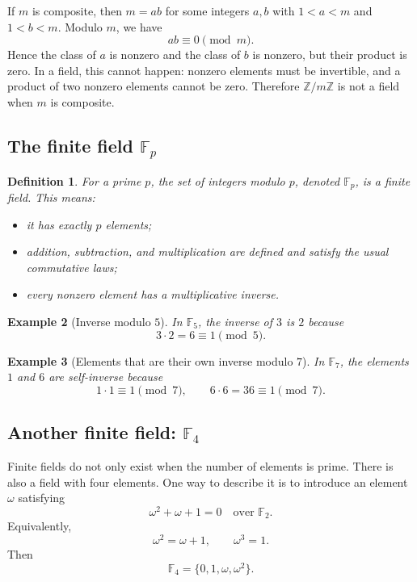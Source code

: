 \documentclass[11pt]{article}
\newtheorem{definition}{Definition}[section]
\newtheorem{example}[definition]{Example}
\newenvironment{solution}{\begin{tcolorbox}[colback=white,colframe=accent!45,title=Solution,boxrule=0.5pt,arc=1.5mm]}{\end{tcolorbox}}
\newcommand{\F}{\mathbb{F}}
\begin{document}
\begin{solution}
If \(m\) is composite, then \(m=ab\) for some integers \(a,b\) with \(1<a<m\) and \(1<b<m\). Modulo \(m\), we have
\[
ab\equiv 0\pmod m.
\]
Hence the class of \(a\) is nonzero and the class of \(b\) is nonzero, but their product is zero. In a field, this cannot happen: nonzero elements must be invertible, and a product of two nonzero elements cannot be zero. Therefore \(\mathbb Z/m\mathbb Z\) is not a field when \(m\) is composite.
\end{solution}

\subsection{The finite field \texorpdfstring{$\F_p$}{Fp}}

\begin{definition}
For a prime \(p\), the set of integers modulo \(p\), denoted \(\F_p\), is a \emph{finite field}. This means:
\begin{itemize}
  \item it has exactly \(p\) elements;
  \item addition, subtraction, and multiplication are defined and satisfy the usual commutative laws;
  \item every nonzero element has a multiplicative inverse.
\end{itemize}
\end{definition}

\begin{example}[Inverse modulo \texorpdfstring{$5$}{5}]
In \(\F_5\), the inverse of \(3\) is \(2\) because
\[
3\cdot 2 = 6 \equiv 1 \pmod 5.
\]
\end{example}

\begin{example}[Elements that are their own inverse modulo \texorpdfstring{$7$}{7}]
In \(\F_7\), the elements \(1\) and \(6\) are self-inverse because
\[
1\cdot 1\equiv 1\pmod 7,
\qquad
6\cdot 6 = 36 \equiv 1\pmod 7.
\]
\end{example}

\subsection{Another finite field: \texorpdfstring{$\F_4$}{F4}}

Finite fields do not only exist when the number of elements is prime. There is also a field with four elements. One way to describe it is to introduce an element \(\omega\) satisfying
\[
\omega^2+\omega+1=0 \quad \text{over }\F_2.
\]
Equivalently,
\[
\omega^2=\omega+1,
\qquad
\omega^3=1.
\]
Then
\[
\F_4=\{0,1,\omega,\omega^2\}.
\]
\end{document}
